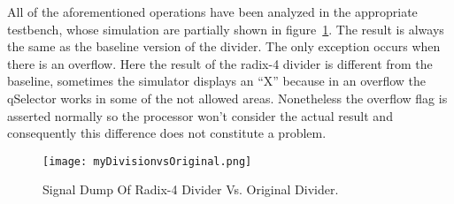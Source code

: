 All of the aforementioned operations have been analyzed in the appropriate testbench, whose simulation are partially shown in figure~\ref{fig:div32_wave}. The result is always the same as the baseline version of the divider. The only exception occurs when there is an overflow. Here the result of the radix-4 divider is different from the baseline, sometimes the simulator displays an ``X'' because in an overflow the qSelector works in some of the not allowed areas. Nonetheless the overflow flag is asserted normally so the processor won't consider the actual result and consequently this difference does not constitute a problem.

\begin{figure}[H]
\centering
\texttt{[image: myDivisionvsOriginal.png]}
\caption{Signal Dump Of Radix-4 Divider Vs. Original Divider.}
\label{fig:div32_wave}
\end{figure}
